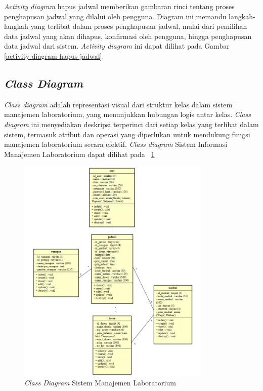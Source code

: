 \textit{Activity diagram} hapus jadwal memberikan gambaran rinci tentang proses penghapusan jadwal yang dilalui oleh pengguna. Diagram ini memandu langkah-langkah yang terlibat dalam proses penghapusan jadwal, mulai dari pemilihan data jadwal yang akan dihapus, konfirmasi oleh pengguna, hingga penghapusan data jadwal dari sistem. \textit{Activity diagram} ini dapat dilihat pada Gambar \ref{activity-diagram-hapus-jadwal}.


\subsection{\textit{Class Diagram}}
\textit{Class diagram} adalah representasi visual dari struktur kelas dalam sistem manajemen laboratorium, yang menunjukkan hubungan logis antar kelas. \textit{Class diagram} ini menyediakan deskripsi terperinci dari setiap kelas yang terlibat dalam sistem, termasuk atribut dan operasi yang diperlukan untuk mendukung fungsi manajemen laboratorium secara efektif. \textit{Class diagram} Sistem Informasi Manajemen Laboratorium dapat dilihat pada \pic~\ref{class-diagram}

\begin{figure}
	\centering
	\includegraphics[width=0.82\textwidth]{konten/gambar/class-diagram.png}
	\caption{\textit{Class Diagram} Sistem Manajemen Laboratorium}
	\label{class-diagram}
\end{figure}

